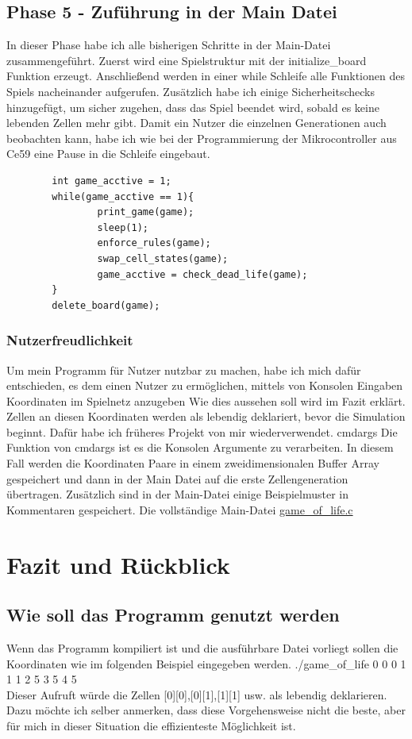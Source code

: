 \documentclass[11pt]{scrartcl}
\begin{document}
\subsection{Phase 5 - Zuführung in der Main Datei}
In dieser Phase habe ich alle bisherigen Schritte in der Main-Datei zusammengeführt. Zuerst wird eine Spielstruktur mit der initialize\_board Funktion erzeugt. Anschlie\ss end werden in einer while Schleife 
alle Funktionen des Spiels nacheinander aufgerufen. Zusätzlich habe ich einige Sicherheitschecks hinzugefügt, um sicher zugehen, dass das Spiel beendet wird, sobald es keine lebenden Zellen mehr gibt.
Damit ein Nutzer die einzelnen Generationen auch beobachten kann, habe ich wie bei der Programmierung der Mikrocontroller aus Ce59 eine Pause in die Schleife eingebaut.
\begin{verbatim}
        int game_acctive = 1;
        while(game_acctive == 1){
                print_game(game);
                sleep(1);
                enforce_rules(game);
                swap_cell_states(game);
                game_acctive = check_dead_life(game);
        }
        delete_board(game);
\end{verbatim}
\subsubsection{Nutzerfreudlichkeit}
Um mein Programm für Nutzer nutzbar zu machen, habe ich mich dafür entschieden, es dem einen Nutzer zu ermöglichen, mittels von Konsolen Eingaben Koordinaten im Spielnetz anzugeben Wie dies aussehen soll wird im Fazit erklärt. 
Zellen an diesen Koordinaten werden als lebendig deklariert, bevor die Simulation beginnt. Dafür habe ich früheres Projekt von mir wiederverwendet. cmdargs
Die Funktion von cmdargs ist es die Konsolen Argumente zu verarbeiten. In diesem Fall werden die Koordinaten Paare in einem zweidimensionalen Buffer Array gespeichert und dann in der Main Datei auf die erste Zellengeneration übertragen.
Zusätzlich sind in der Main-Datei einige Beispielmuster in Kommentaren gespeichert. Die vollständige Main-Datei \href{https://gitlab.rz.htw-berlin.de/Lennard.Wittenberg/c-project-wise-lennard-wittenberg/-/blob/main/game_of_life.c}{game\_of\_life.c}
%
\section{Fazit und Rückblick}
\subsection{Wie soll das Programm genutzt werden}
Wenn das Programm kompiliert ist und die ausführbare Datei vorliegt sollen die Koordinaten wie im folgenden Beispiel eingegeben werden. ./game\_of\_life 0 0 0 1 1 1 2 5 3 5 4 5\\
Dieser Aufruft würde die Zellen [0][0],[0][1],[1][1] usw. als lebendig deklarieren. Dazu möchte ich selber anmerken, dass diese Vorgehensweise nicht die beste, aber für mich in dieser Situation die effizienteste Möglichkeit ist.
\end{document}
